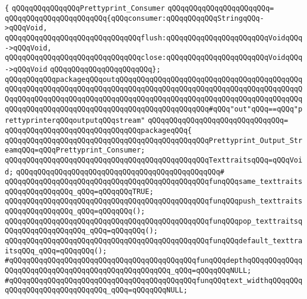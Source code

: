 \verb|{|\newline
\verb|qQQqqQQqqQQqqQQqPrettyprint_Consumer|\newline
\verb|qQQqqQQqqQQqqQQqqQQqqQQq=|\newline
\verb|qQQqqQQqqQQqqQQqqQQqqQQq{qQQqconsumer:qQQqqQQqqQQqStringqQQq->qQQqVoid,|\newline
\verb|qQQqqQQqqQQqqQQqqQQqqQQqqQQqqQQqflush:qQQqqQQqqQQqqQQqqQQqqQQqVoidqQQq->qQQqVoid,|\newline
\verb|qQQqqQQqqQQqqQQqqQQqqQQqqQQqqQQqclose:qQQqqQQqqQQqqQQqqQQqqQQqVoidqQQq->qQQqVoid|\newline
\verb|qQQqqQQqqQQqqQQqqQQqqQQq};|\newline
\newline
\verb|qQQqqQQqqQQqpackageqQQqoutqQQqqQQqqQQqqQQqqQQqqQQqqQQqqQQqqQQqqQQqqQQqqQQqqQQqqQQqqQQqqQQqqQQqqQQqqQQqqQQqqQQqqQQqqQQqqQQqqQQqqQQqqQQqqQQqqQQqqQQqqQQqqQQqqQQqqQQqqQQqqQQqqQQqqQQqqQQqqQQqqQQqqQQqqQQqqQQqqQQqqQQqqQQqqQQqqQQqqQQqqQQqqQQqqQQqqQQqqQQqqQQqqQQqqQQq#qQQq"out"qQQq==qQQq"prettyprinterqQQqoutputqQQqstream"|\newline
\verb|qQQqqQQqqQQqqQQqqQQqqQQqqQQqqQQq=|\newline
\verb|qQQqqQQqqQQqqQQqqQQqqQQqqQQqqQQqpackageqQQq{|\newline
\verb|qQQqqQQqqQQqqQQqqQQqqQQqqQQqqQQqqQQqqQQqqQQqqQQqPrettyprint_Output_StreamqQQq=qQQqPrettyprint_Consumer;|\newline
\verb|qQQqqQQqqQQqqQQqqQQqqQQqqQQqqQQqqQQqqQQqqQQqqQQqTexttraitsqQQq=qQQqVoid;|\newline
\verb|qQQqqQQqqQQqqQQqqQQqqQQqqQQqqQQqqQQqqQQqqQQqqQQq#|\newline
\verb|qQQqqQQqqQQqqQQqqQQqqQQqqQQqqQQqqQQqqQQqqQQqqQQqfunqQQqsame_texttraitsqQQqqQQqqQQqqQQq_qQQq=qQQqqQQqTRUE;|\newline
\verb|qQQqqQQqqQQqqQQqqQQqqQQqqQQqqQQqqQQqqQQqqQQqqQQqfunqQQqpush_texttraitsqQQqqQQqqQQqqQQq_qQQq=qQQqqQQq();|\newline
\verb|qQQqqQQqqQQqqQQqqQQqqQQqqQQqqQQqqQQqqQQqqQQqqQQqfunqQQqpop_texttraitsqQQqqQQqqQQqqQQqqQQq_qQQq=qQQqqQQq();|\newline
\verb|qQQqqQQqqQQqqQQqqQQqqQQqqQQqqQQqqQQqqQQqqQQqqQQqfunqQQqdefault_texttraitsqQQq_qQQq=qQQqqQQq();|\newline
\verb|#qQQqqQQqqQQqqQQqqQQqqQQqqQQqqQQqqQQqqQQqqQQqfunqQQqdepthqQQqqQQqqQQqqQQqqQQqqQQqqQQqqQQqqQQqqQQqqQQqqQQqqQQq_qQQq=qQQqqQQqNULL;|\newline
\verb|#qQQqqQQqqQQqqQQqqQQqqQQqqQQqqQQqqQQqqQQqqQQqfunqQQqtext_widthqQQqqQQqqQQqqQQqqQQqqQQqqQQqqQQq_qQQq=qQQqqQQqNULL;|\newline
